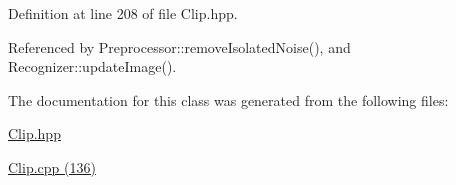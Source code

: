 Definition at line 208 of file Clip.hpp.

Referenced by Preprocessor::removeIsolatedNoise(), and Recognizer::updateImage().

The documentation for this class was generated from the following files:\begin{CompactItemize}
\item 
\hyperlink{_clip_8hpp}{Clip.hpp}\item 
\hyperlink{_clip_8cpp}{Clip.cpp (136)}\end{CompactItemize}
